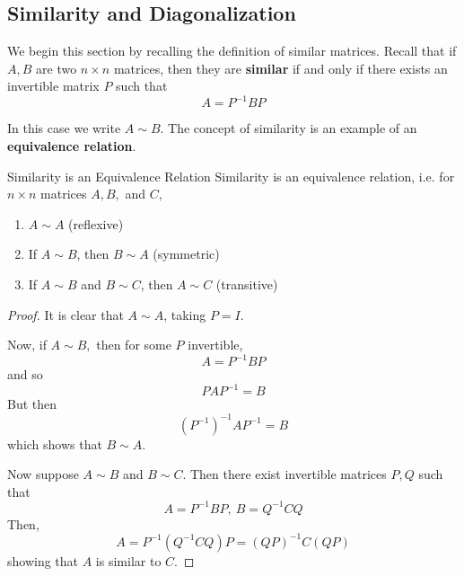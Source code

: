 \subsection{Similarity and Diagonalization}

We begin this section by recalling the definition  of similar matrices. 
Recall that if $A,B$ are two $n\times n$ matrices, then they are \textbf{similar} 
if and only if there exists an invertible matrix $P$
such that
\begin{equation*}
A=P^{-1}BP
\end{equation*}

In this case we write $A \sim B$. The concept of similarity is an example of an \textbf{equivalence relation}.  

\begin{lemma}{Similarity is an Equivalence Relation}\label{lem:similarityequivalence}
Similarity is an equivalence relation, i.e. for $n \times n$ matrices $A,B,$ and $C$, 
\begin{enumerate}
\item $A \sim A$ (reflexive)
\item If $A \sim B$, then $B \sim A$ (symmetric)
\item If $A \sim B$ and $B \sim C$, then $A \sim C$ (transitive)
\end{enumerate}
\end{lemma}

\begin{proof}
It is clear that $A\sim A$, taking $P=I$. 

Now, if $A\sim B,$ then for some $P$ invertible,
\begin{equation*}
A=P^{-1}BP
\end{equation*}
and so
\begin{equation*}
PAP^{-1}=B
\end{equation*}
But then
\begin{equation*}
\left( P^{-1}\right) ^{-1}AP^{-1}=B
\end{equation*}
which shows that $B\sim A$.

Now suppose $A\sim B$ and $B\sim C$. Then there exist invertible matrices 
$P,Q$ such that
\begin{equation*}
A=P^{-1}BP,\ B=Q^{-1}CQ
\end{equation*}
Then,
\begin{equation*}
A=P^{-1} \left( Q^{-1}CQ \right)P=\left( QP\right) ^{-1}C\left( QP\right)
\end{equation*}
showing that $A$ is similar to $C$.
\end{proof}

